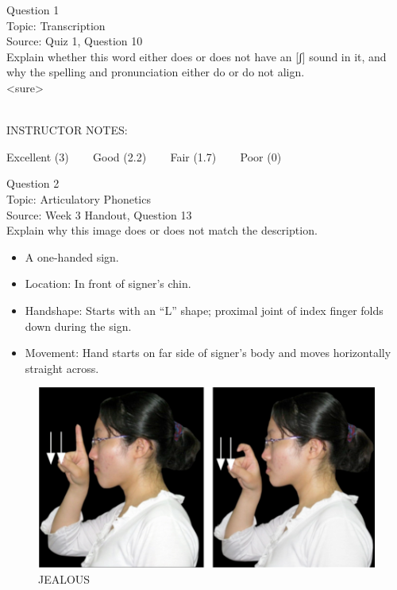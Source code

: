 \documentclass[12pt]{article}
\begin{document}
\begin{center}
\textbf{{\color{blue}{\HUGE START OF EXAM\\}}}

\textbf{{\color{blue}{\HUGE Student ID: 34785\\}}}

\textbf{{\color{blue}{\HUGE \\}}}

\end{center}
\newpage

{\large Question 1}\\

Topic: Transcription\\
Source: Quiz 1, Question 10\\

Explain whether this word either does or does not have an [ʃ] sound in it, and why the spelling and pronunciation either do or do not align.\\

<sure>


~\\
INSTRUCTOR NOTES: 


\vfill
Excellent (3) ~~~ Good (2.2) ~~~ Fair (1.7) ~~~ Poor (0)
\newpage

{\large Question 2}\\

Topic: Articulatory Phonetics\\
Source: Week 3 Handout, Question 13\\

Explain why this image does or does not match the description.\\

\begin{itemize} \item A one-handed sign. \item Location: In front of signer’s chin. \item Handshape: Starts with an “L” shape; proximal joint of index finger folds down during the sign. \item Movement: Hand starts on far side of signer’s body and moves horizontally straight across. \end{itemize}

\begin{figure}[H]
\includegraphics{../images/taiwansign_jealous.png}
\caption{JEALOUS}
\end{figure}
\end{document}
